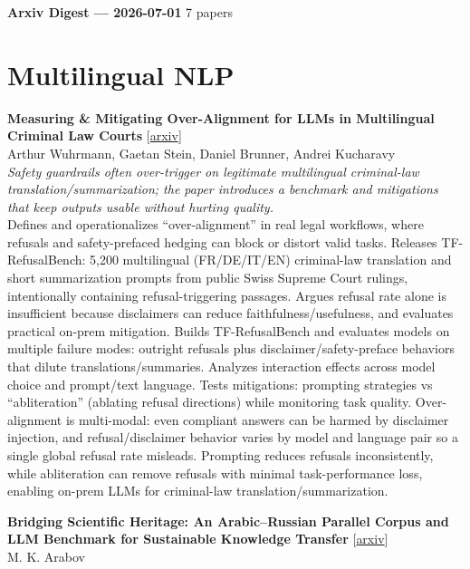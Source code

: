\documentclass[12pt,letterpaper]{article}
\begin{document}
{\footnotesize\textbf{Arxiv Digest --- 2026-07-01} \hfill 7 papers}

\smallskip

\section*{Multilingual NLP}

{\small\textbf{Measuring \& Mitigating Over-Alignment for LLMs in Multilingual Criminal Law Courts}} {\scriptsize[\href{https://arxiv.org/abs/2606.23375}{arxiv}]}\\
{\scriptsize Arthur Wuhrmann, Gaetan Stein, Daniel Brunner, Andrei Kucharavy}\\

{\small\textit{Safety guardrails often over-trigger on legitimate multilingual criminal-law translation/summarization; the paper introduces a benchmark and mitigations that keep outputs usable without hurting quality.}}\\[1pt]
{\footnotesize Defines and operationalizes ``over-alignment'' in real legal workflows, where refusals and safety-prefaced hedging can block or distort valid tasks. Releases TF-RefusalBench: 5,200 multilingual (FR/DE/IT/EN) criminal-law translation and short summarization prompts from public Swiss Supreme Court rulings, intentionally containing refusal-triggering passages. Argues refusal rate alone is insufficient because disclaimers can reduce faithfulness/usefulness, and evaluates practical on-prem mitigation. Builds TF-RefusalBench and evaluates models on multiple failure modes: outright refusals plus disclaimer/safety-preface behaviors that dilute translations/summaries. Analyzes interaction effects across model choice and prompt/text language. Tests mitigations: prompting strategies vs ``abliteration'' (ablating refusal directions) while monitoring task quality. Over-alignment is multi-modal: even compliant answers can be harmed by disclaimer injection, and refusal/disclaimer behavior varies by model and language pair so a single global refusal rate misleads. Prompting reduces refusals inconsistently, while abliteration can remove refusals with minimal task-performance loss, enabling on-prem LLMs for criminal-law translation/summarization.}

\medskip

{\small\textbf{Bridging Scientific Heritage: An Arabic--Russian Parallel Corpus and LLM Benchmark for Sustainable Knowledge Transfer}} {\scriptsize[\href{https://arxiv.org/abs/2606.30943}{arxiv}]}\\
{\scriptsize M. K. Arabov}\\
\end{document}
